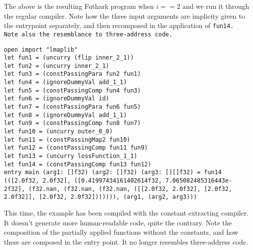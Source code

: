 The above is the resulting Futhark program when $i==2$ and we run it through the
regular compiler. Note how the three input arguments are implicity given to the
entrypoint separately, and then recomposed in the application of \tt{fun14}.
Note also the resemblance to three-address code.

\begin{verbatim}
open import "lmaplib"
let fun1 = (uncurry (flip inner_2_1))
let fun2 = (uncurry inner_2_1)
let fun3 = (constPassingPara fun2 fun1)
let fun4 = (ignoreDummyVal add_1_1)
let fun5 = (constPassingComp fun4 fun3)
let fun6 = (ignoreDummyVal id)
let fun7 = (constPassingPara fun6 fun5)
let fun8 = (ignoreDummyVal add_1_1)
let fun9 = (constPassingComp fun8 fun7)
let fun10 = (uncurry outer_0_0)
let fun11 = (constPassingMap2 fun10)
let fun12 = (constPassingComp fun11 fun9)
let fun13 = (uncurry lossFunction_1_1)
let fun14 = (constPassingComp fun13 fun12)
entry main (arg1: []f32) (arg2: []f32) (arg3: [][]f32) = fun14 (([2.0f32, 2.0f32], ([0.41997434161402614f32, 7.065082485316443e-2f32], (f32.nan, (f32.nan, (f32.nan, ([[2.0f32, 2.0f32], [2.0f32, 2.0f32]], [2.0f32, 2.0f32])))))), (arg1, (arg2, arg3)))
\end{verbatim}

This time, the example has been compiled with the constant extracting compiler.
It doesn't generate more human-readable code, quite the contrary. Note the
composition of the partially applied functions without the constants, and
how these are composed in the entry point. It no longer resembles three-address code.

